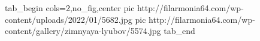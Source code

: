  
 
 
 
 

\ifcmt
  tab_begin cols=2,no_fig,center
     pic http://filarmonia64.com/wp-content/uploads/2022/01/5682.jpg
		 pic http://filarmonia64.com/wp-content/gallery/zimnyaya-lyubov/5574.jpg
  tab_end
\fi
